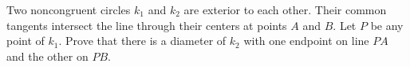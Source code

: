 Two noncongruent circles $k_1$ and $k_2$ are exterior to each other. Their common tangents intersect the line through their centers at points $A$ and $B$. Let $P$ be any point of $k_1$. Prove that there is a diameter of $k_2$ with one endpoint on line $PA$ and the other on $PB$.